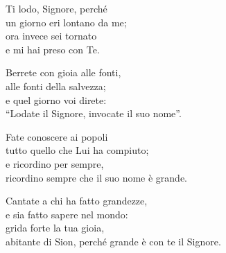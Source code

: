 
\strofa Ti lodo, Signore, perché\\
un giorno eri lontano da me;\\
ora invece sei tornato\\
e mi hai preso con Te.

\spazio


\spazio

\strofa Berrete con gioia alle fonti,\\
alle fonti della salvezza;\\
e quel giorno voi direte:\\
``Lodate il Signore, invocate il suo nome''.

\spazio


\spazio

\strofa Fate conoscere ai popoli\\
tutto quello che Lui ha compiuto;\\
e ricordino per sempre,\\
ricordino sempre che il suo nome è grande.

\spazio


\spazio

\strofa Cantate a chi ha fatto grandezze,\\
e sia fatto sapere nel mondo:\\
grida forte la tua gioia,\\
abitante di Sion, perché grande è con te il Signore.

\spazio

